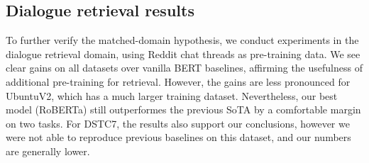 \documentclass[11pt]{article}
\begin{document}
\begin{table*}
\centering
{}
\caption{Dialogue retrieval results. }
\label{tab:dialogue}
\vspace{-4mm}
\end{table*} \subsection{Dialogue retrieval results}\label{sec:dialogue_results}
To further verify the matched-domain hypothesis, we conduct experiments in the dialogue retrieval domain, using Reddit chat threads as pre-training data.  We see clear gains on all datasets over vanilla BERT baselines, affirming the usefulness of additional pre-training for retrieval.  However, the gains are less pronounced for UbuntuV2, which has a much larger training dataset.  Nevertheless, our best model (RoBERTa) still outperformes the previous SoTA by a comfortable margin on two tasks.  For DSTC7, the results also support our conclusions, however we were not able to reproduce previous baselines on this dataset, and our numbers are generally lower.
 
\end{document}
